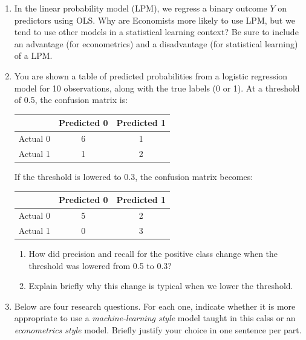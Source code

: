 \documentclass[11pt]{article}
\begin{document}
\begin{enumerate}[leftmargin=*]
\item In the linear probability model (LPM), we regress a binary outcome $Y$ on predictors using OLS. Why are Economists more likely to use LPM, but we tend to use other models in a statistical learning context? Be sure to include an advantage (for econometrics) and a disadvantage (for statistical learning) of a LPM. 

\clearpage


\item  You are shown a table of predicted probabilities from a logistic regression model for 10 observations, along with the true labels (0 or 1). At a threshold of 0.5, the confusion matrix is:
\begin{center}
\begin{tabular}{l|cc}
 & Predicted 0 & Predicted 1 \\\hline
Actual 0 & 6 & 1 \\
Actual 1 & 1 & 2 \\
\end{tabular}
\end{center}
If the threshold is lowered to 0.3, the confusion matrix becomes:
\begin{center}
\begin{tabular}{l|cc}
 & Predicted 0 & Predicted 1 \\\hline
Actual 0 & 5 & 2 \\
Actual 1 & 0 & 3 \\
\end{tabular}
\end{center}
\begin{enumerate}
  \item How did precision and recall for the positive class change when the threshold was lowered from 0.5 to 0.3?
  \vspace{3cm}  
  \item Explain briefly why this change is typical when we lower the threshold.
  \vspace{2cm}  
\end{enumerate} 


\item Below are four research questions. For each one, indicate whether it is more appropriate to use a \emph{machine-learning style} model taught in this calss or an \emph{econometrics style} model. Briefly justify your choice in one sentence per part.



\end{enumerate}
\end{document}
